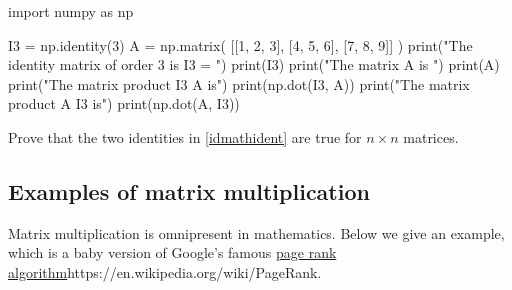 \documentclass{article}
\begin{document}
\begin{sage}
import numpy as np
  
I3 = np.identity(3)
A = np.matrix( [[1, 2, 3], [4, 5, 6], [7, 8, 9]] )
print("The identity matrix of order 3 is I3 = ")
print(I3)
print("The matrix A is ")
print(A)
print("The matrix product I3 A is")
print(np.dot(I3, A))
print("The matrix product A I3 is")
print(np.dot(A, I3))
\end{sage}

\beginshex
Prove that the two identities in \eqref{idmathident} are true for $n\times n$ matrices.
\endshex

\subsection{Examples of matrix multiplication}
Matrix multiplication is omnipresent in mathematics. Below we give an example,
which is a baby version of 
Google's famous \url{page rank algorithm}{https://en.wikipedia.org/wiki/PageRank}.
\end{document}
